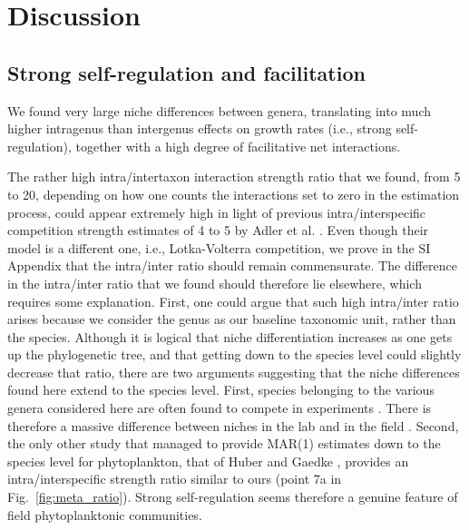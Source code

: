 \documentclass[9pt,twocolumn,twoside,lineno]{pnas-new}
\begin{document}
\section*{Discussion}

\subsection*{Strong self-regulation and facilitation}

We found very large niche differences between genera, translating
into much higher intragenus than intergenus effects on growth rates
(i.e., strong self-regulation), together with a high degree of facilitative
net interactions.

The rather high intra/intertaxon interaction strength ratio \cite{levine_importance_2009}
that we found, from 5 to 20, depending on how one counts the interactions
set to zero in the estimation process, could appear extremely high
in light of previous intra/interspecific competition strength estimates
of 4 to 5 by Adler et al. \cite{adler_competition_2018}. Even
though their model is a different one, i.e., Lotka-Volterra competition,
we prove in the SI Appendix that the intra/inter ratio
should remain commensurate. The difference in the intra/inter ratio
that we found should therefore lie elsewhere, which requires some
explanation. First, one could argue that such high intra/inter ratio
arises because we consider the genus as our baseline taxonomic unit,
rather than the species. Although it is logical that niche differentiation
increases as one gets up the phylogenetic tree, and that getting down
to the species level could slightly decrease that ratio, there are
two arguments suggesting that the niche differences found here extend
to the species level. First, species belonging to the various genera
considered here are often found to compete in experiments \cite{titman_ecological_1976,tilman_phytoplankton_1982,descamps-julien_stable_2005}.
There is therefore a massive difference between niches in the lab
and in the field \cite{barraquand_coastal_2018}. Second, the
only other study that managed to provide MAR(1) estimates down to
the species level for phytoplankton, that of Huber and Gaedke \cite{huber_role_2006},
provides an intra/interspecific strength ratio similar to ours (point
7a in Fig.~\ref{fig:meta_ratio}). Strong self-regulation seems therefore
a genuine feature of field phytoplanktonic communities.
\end{document}
